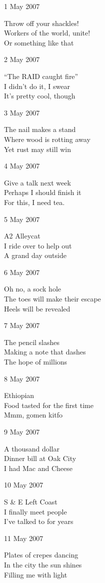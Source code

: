 \documentclass[12pt]{article}
\begin{document}
1 May 2007

Throw off your shackles! \\
Workers of the world, unite! \\
Or something like that

2 May 2007

``The RAID caught fire'' \\
I didn't do it, I swear \\
It's pretty cool, though

3 May 2007

The nail makes a stand \\
Where wood is rotting away \\
Yet rust may still win

4 May 2007

Give a talk next week \\
Perhaps I should finish it \\
For this, I need tea.


\newpage

5 May 2007

A2 Alleycat \\
I ride over to help out \\
A grand day outside

6 May 2007

Oh no, a sock hole \\
The toes will make their escape \\
Heels will be revealed

7 May 2007

The pencil slashes \\
Making a note that dashes \\
The hope of millions

8 May 2007

Ethiopian \\
Food tasted for the first time \\
Mmm, gomen kitfo 

9 May 2007

A thousand dollar \\
Dinner bill at Oak City \\
I had Mac and Cheese

10 May 2007

S \& E Left Coast \\
I finally meet people \\
I've talked to for years

11 May 2007

Plates of crepes dancing \\
In the city the sun shines \\
Filling me with light
\end{document}

